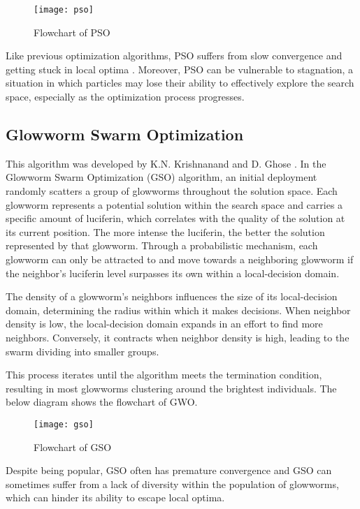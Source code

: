 \documentclass[conference]{IEEEtran}
\begin{document}
\begin{abstract1}
\begin{figure}[htbp]
	\centerline{\texttt{[image: pso]}}
	\caption{Flowchart of PSO}
	\label{FlowchartPSO}
\end{figure}

Like previous optimization algorithms, PSO suffers from slow convergence and getting stuck in local optima \cite{nezamabadi2008binary}. Moreover, PSO can be vulnerable to stagnation, a situation in which particles may lose their ability to effectively explore the search space, especially as the optimization process progresses.

\subsection{Glowworm Swarm Optimization}
This algorithm was developed by K.N. Krishnanand and D. Ghose \cite{krishnanand2005detection}. In the Glowworm Swarm Optimization (GSO) algorithm, an initial deployment randomly scatters a group of glowworms throughout the solution space. Each glowworm represents a potential solution within the search space and carries a specific amount of luciferin, which correlates with the quality of the solution at its current position. The more intense the luciferin, the better the solution represented by that glowworm. Through a probabilistic mechanism, each glowworm can only be attracted to and move towards a neighboring glowworm if the neighbor's luciferin level surpasses its own within a local-decision domain.

The density of a glowworm's neighbors influences the size of its local-decision domain, determining the radius within which it makes decisions. When neighbor density is low, the local-decision domain expands in an effort to find more neighbors. Conversely, it contracts when neighbor density is high, leading to the swarm dividing into smaller groups.

This process iterates until the algorithm meets the termination condition, resulting in most glowworms clustering around the brightest individuals. The below diagram shows the flowchart of GWO\cite{javed2019comprehensive}.


\begin{figure}[htbp]
	\centerline{\texttt{[image: gso]}}
	\caption{Flowchart of GSO}
	\label{FlowchartGSO}
\end{figure}


Despite being popular, GSO often has premature convergence and GSO can sometimes suffer from a lack of diversity within the population of glowworms, which can hinder its ability to escape local optima\cite{wu2012improvement}.




\end{abstract1}
\end{document}
